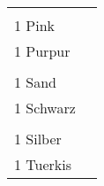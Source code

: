 \documentclass{article}\usepackage[ngerman]{babel}\usepackage{geometry}\usepackage{lmodern}
\begin{document}
\begin{table}[p]
  \begin{tabular}{ll}    \hspace{-2em}    \fbox{\begin{minipage}[t][6cm][t]{8cm}
        \fontsize{45}{54} \selectfont
        \phantom{ }\\
      \phantom{ }1 Pink    \end{minipage}}
    &
\fbox{\begin{minipage}[t][6cm][t]{8cm}
        \fontsize{45}{54} \selectfont
        \phantom{ }\\
        \phantom{ } 1 Purpur      \end{minipage}}\\    \hspace{-2em}    \fbox{\begin{minipage}[t][6cm][t]{8cm}
        \fontsize{45}{54} \selectfont
        \phantom{ }\\
      \phantom{ }1 Sand    \end{minipage}}
    &
\fbox{\begin{minipage}[t][6cm][t]{8cm}
        \fontsize{45}{54} \selectfont
        \phantom{ }\\
        \phantom{ } 1 Schwarz      \end{minipage}}\\    \hspace{-2em}    \fbox{\begin{minipage}[t][6cm][t]{8cm}
        \fontsize{45}{54} \selectfont
        \phantom{ }\\
      \phantom{ }1 Silber    \end{minipage}}
    &
\fbox{\begin{minipage}[t][6cm][t]{8cm}
        \fontsize{45}{54} \selectfont
        \phantom{ }\\
        \phantom{ } 1 Tuerkis      \end{minipage}}\\\end{tabular}
\end{table}
\end{document}
